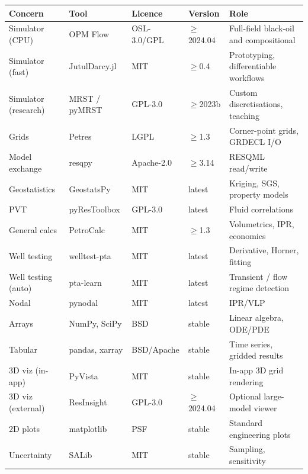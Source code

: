 \documentclass[11pt,a4paper]{article}
\begin{document}
\begin{longtable}{@{}p{2.4cm}p{2.9cm}p{1.9cm}p{1.7cm}p{4.5cm}@{}}
\toprule
\textbf{Concern} & \textbf{Tool} & \textbf{Licence} & \textbf{Version} & \textbf{Role}\\
\midrule
\endhead
Simulator (CPU)     & OPM Flow        & OSL-3.0/GPL & $\geq$2024.04 & Full-field black-oil and compositional\\
Simulator (fast)    & JutulDarcy.jl   & MIT         & $\geq$0.4     & Prototyping, differentiable workflows\\
Simulator (research)& MRST / pyMRST   & GPL-3.0     & $\geq$2023b   & Custom discretisations, teaching\\
Grids               & Petres          & LGPL        & $\geq$1.3     & Corner-point grids, GRDECL I/O\\
Model exchange      & resqpy          & Apache-2.0  & $\geq$3.14    & RESQML read/write\\
Geostatistics       & GeostatsPy      & MIT         & latest        & Kriging, SGS, property models\\
PVT                 & pyResToolbox    & GPL-3.0     & latest        & Fluid correlations\\
General calcs       & PetroCalc       & MIT         & $\geq$1.3     & Volumetrics, IPR, economics\\
Well testing        & welltest-pta    & MIT         & latest        & Derivative, Horner, fitting\\
Well testing (auto) & pta-learn       & MIT         & latest        & Transient / flow regime detection\\
Nodal               & pynodal         & MIT         & latest        & IPR/VLP\\
Arrays              & NumPy, SciPy    & BSD         & stable        & Linear algebra, ODE/PDE\\
Tabular             & pandas, xarray  & BSD/Apache  & stable        & Time series, gridded results\\
3D viz (in-app)     & PyVista         & MIT         & stable        & In-app 3D grid rendering\\
3D viz (external)   & ResInsight      & GPL-3.0     & $\geq$2024.04 & Optional large-model viewer\\
2D plots            & matplotlib      & PSF         & stable        & Standard engineering plots\\
Uncertainty         & SALib           & MIT         & stable        & Sampling, sensitivity\\

\end{longtable}
\end{document}
